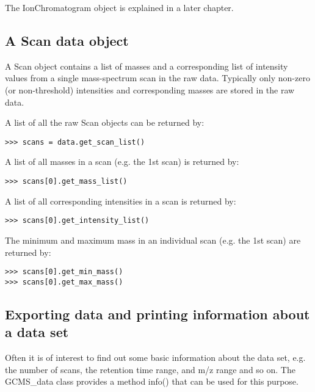 \noindent
The IonChromatogram object is explained in a later chapter.

\subsection{A Scan data object}

A Scan object contains a list of masses and a corresponding list of intensity
values from a single mass-spectrum scan in the raw data. Typically only
non-zero (or non-threshold) intensities and corresponding masses are stored in
the raw data.


A list of all the raw Scan objects can be returned by:

\begin{verbatim}
>>> scans = data.get_scan_list()
\end{verbatim}

A list of all masses in a scan (e.g. the 1st scan) is returned by:

\begin{verbatim}
>>> scans[0].get_mass_list()
\end{verbatim}

A list of all corresponding intensities in a scan is returned by:

\begin{verbatim}
>>> scans[0].get_intensity_list()
\end{verbatim}

The minimum and maximum mass in an individual scan (e.g. the 1st scan) are
returned by:

\begin{verbatim}
>>> scans[0].get_min_mass()
>>> scans[0].get_max_mass()
\end{verbatim}

\subsection{Exporting data and printing information about a data set}


Often it is of interest to find out some basic information about the
data set, e.g. the number of scans, the retention time range, and
m/z range and so on. The GCMS\_data class provides a method info()
that can be used for this purpose.

